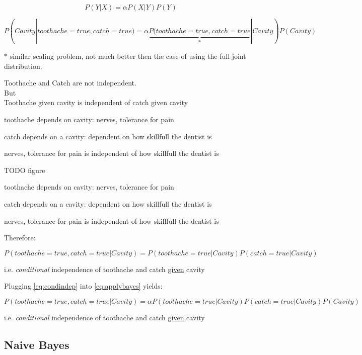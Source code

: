 \begin{frame}\frametitle{\subsecname}

\begin{equation}
P(Y|X) = \alpha P(X|Y)P(Y)
\end{equation}

\begin{equation}
P(Cavity|toothache=true, catch=true) = \alpha \underbrace{P(toothache=true, catch=true}_{*} | Cavity)P(Cavity)
\label{eq:applybayes}
\end{equation}

$*$ similar scaling problem, not much better then the case of using the full joint distribution.


\begin{center}
Toothache and Catch are not independent.\\
But\\
Toothache given cavity is independent of catch given cavity
\end{center}

toothache depends on cavity: nerves, tolerance for pain

catch depends on a cavity: dependent on how skillfull the dentist is

nerves, tolerance for pain is independent of how skillfull the dentist is

TODO figure




\end{frame}

\begin{frame}


toothache depends on cavity: nerves, tolerance for pain

catch depends on a cavity: dependent on how skillfull the dentist is

nerves, tolerance for pain is independent of how skillfull the dentist is


Therefore:

\begin{equation}
P(toothache=true, catch=true | Cavity) = P(toothache=true| Cavity) P(catch=true| Cavity)
\label{eq:condindep}
\end{equation}

i.e. \emph{conditional} independence of toothache and catch \underline{given} cavity

Plugging \eqref{eq:condindep} into \eqref{eq:applybayes} yields:

\begin{equation}
P(toothache=true, catch=true | Cavity) = \alpha P(toothache=true| Cavity) P(catch=true| Cavity) P(Cavity)
\end{equation}

i.e. \emph{conditional} independence of toothache and catch \underline{given} cavity
\end{frame}

\subsection{Naive Bayes}

\begin{frame}\frametitle{\subsecname}
\end{frame}
